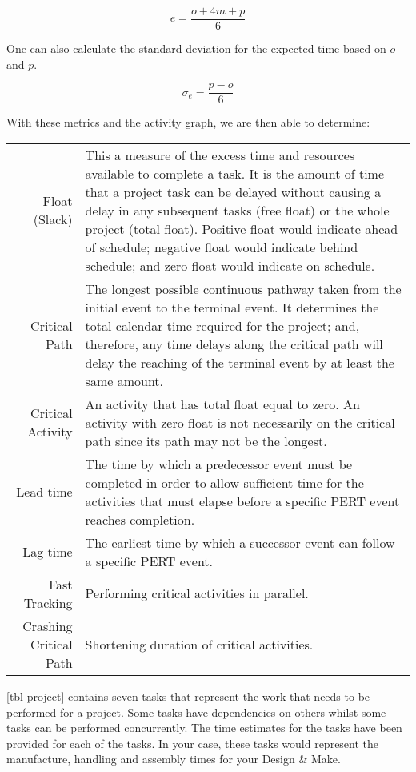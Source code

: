 \begin{equation}
  e = \frac{o+4m+p}{6}
  \label{equ-time}
\end{equation}

One can also calculate the standard deviation for the expected time based on $o$ and $p$.

\begin{equation}
  \sigma_e = \frac{p-o}{6}
\end{equation}

With these metrics and the activity graph, we are then able to determine:

\begin{table}
  \small
  \begin{tabular}{r p{}}
    Float (Slack) & This a measure of the excess time and resources available to complete a task. It is the amount of time that a project task can be delayed without causing a delay in any subsequent tasks (free float) or the whole project (total float). Positive float would indicate ahead of schedule; negative float would indicate behind schedule; and zero float would indicate on schedule. \\
    Critical Path & The longest possible continuous pathway taken from the initial event to the terminal event. It determines the total calendar time required for the project; and, therefore, any time delays along the critical path will delay the reaching of the terminal event by at least the same amount. \\
    Critical Activity & An activity that has total float equal to zero. An activity with zero float is not necessarily on the critical path since its path may not be the longest. \\
    Lead time & The time by which a predecessor event must be completed in order to allow sufficient time for the activities that must elapse before a specific \ac{PERT} event reaches completion. \\
    Lag time & The earliest time by which a successor event can follow a specific \ac{PERT} event. \\
    Fast Tracking & Performing critical activities in parallel. \\
    Crashing Critical Path & Shortening duration of critical activities. \\
  \end{tabular}
\end{table}


\cref{tbl-project} contains seven tasks that represent the work that needs to be performed for a project. Some tasks have dependencies on others whilst some tasks can be performed concurrently. The time estimates for the tasks have been provided for each of the tasks. In your case, these tasks would represent the manufacture, handling and assembly times for your Design \& Make.

